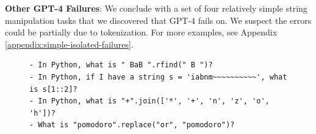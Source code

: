 \documentclass{article}
\theoremstyle{plain}
\theoremstyle{definition}
\theoremstyle{remark}
\begin{document}
\textbf{Other GPT-4 Failures}: We conclude with a set of four relatively simple string manipulation tasks that we discovered that GPT-4 fails on. We suspect the errors could be partially due to tokenization.
For more examples, see Appendix \ref{appendix:simple-isolated-failures}.

\begin{figure}[htb!]
\begin{lstlisting}[caption={}]
- In Python, what is " BaB ".rfind(" B ")?
- In Python, if I have a string s = 'iabnm~~~~~~~~~~', what is s[1::2]?
- In Python, what is "+".join(['*', '+', 'n', 'z', 'o', 'h'])?
- What is "pomodoro".replace("or", "pomodoro")?
\end{lstlisting}
\end{figure}



\end{document}
